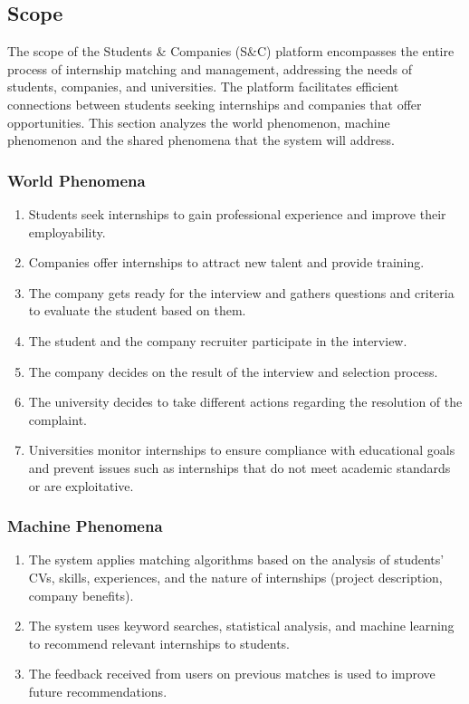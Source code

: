 \subsection{Scope}
The scope of the Students \& Companies (S\&C) platform encompasses the entire process of internship matching and management, addressing the needs of students, companies, and universities. The platform facilitates efficient connections between students seeking internships and companies that offer opportunities. This section analyzes the world phenomenon, machine phenomenon and the shared phenomena that the system will address.

\subsubsection{World Phenomena}
\begin{enumerate}[label=WP{\arabic*}]
\item 
Students seek internships to gain professional experience and improve their employability.
\item 
Companies offer internships to attract new talent and provide training.
\item 
The company gets ready for the interview and gathers questions and criteria to evaluate the student based on them.
\item
The student and the company recruiter participate in the interview.
\item
The company decides on the result of the interview and selection process.
\item
The university decides to take different actions regarding the resolution of the complaint. 
\item
Universities monitor internships to ensure compliance with educational goals and prevent issues such as internships that do not meet academic standards or are exploitative.
\end{enumerate}

\subsubsection{Machine Phenomena}
\begin{enumerate}[label=MP{\arabic*}]
\item
The system applies matching algorithms based on the analysis of students' CVs, skills, experiences, and the nature of internships (project description, company benefits).
\item
The system uses keyword searches, statistical analysis, and machine learning to recommend relevant internships to students.
\item 
The feedback received from users on previous matches is used to improve future recommendations.
\end{enumerate}

